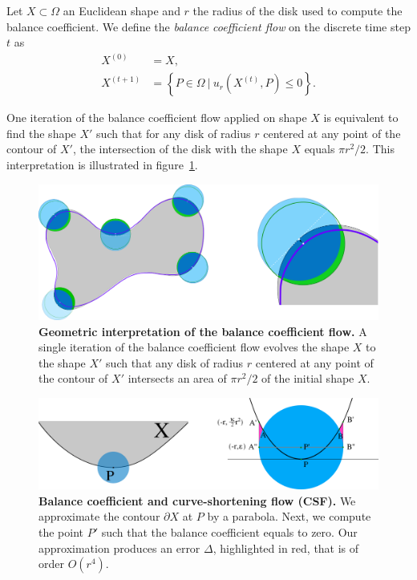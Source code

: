 \documentclass[smallextended]{svjour3}
\begin{document}
\begin{definition}
	Let $X \subset \Omega$ an Euclidean shape and $r$ the radius of the disk used to compute the balance coefficient. We define the \emph{balance coefficient flow} on the discrete time step $t$ as
%
%
\begin{align*}
	X^{(0)} &= X, \\
	X^{(t+1)} &= \left\{ P \in \Omega \: | \: u_r(X^{(t)},P) \leq 0 \right\}.
\end{align*}
%
%
\end{definition}
%
%
 One iteration of the balance coefficient flow applied on shape $X$ is equivalent to find the shape $X'$ such that for any disk of radius $r$ centered at any point of the contour of $X'$, the intersection of the disk with the shape $X$ equals $\pi r^2/2$. This interpretation is illustrated in figure~\ref{fig:geometric-interpretation}.
%
% 
\begin{figure}
\center
\includegraphics[scale=0.25]{figures/zero-level-set/geometric-interpretation.png}
\caption{\textbf{Geometric interpretation of the balance coefficient flow.} A single iteration of the balance coefficient flow evolves the shape $X$ to the shape $X'$ such that any disk of radius $r$ centered at any point of the contour of $X'$ intersects  an area of $\pi r^2/2$ of the initial shape $X$.}
\label{fig:geometric-interpretation}
\end{figure}
% 
%
%
%
\begin{figure}
\center
\includegraphics[scale=0.75]{figures/analysis-error/geometry-argument.png}
\caption{\textbf{Balance coefficient and curve-shortening flow (CSF).} We approximate the contour $\partial X$ at $P$ by a parabola. Next, we compute the point $P'$ such that the balance coefficient equals to zero. Our approximation produces an error $\Delta$, highlighted in red, that is of order $O(r^4)$. }
\label{fig:geometric-argument}
\end{figure}
\end{document}
